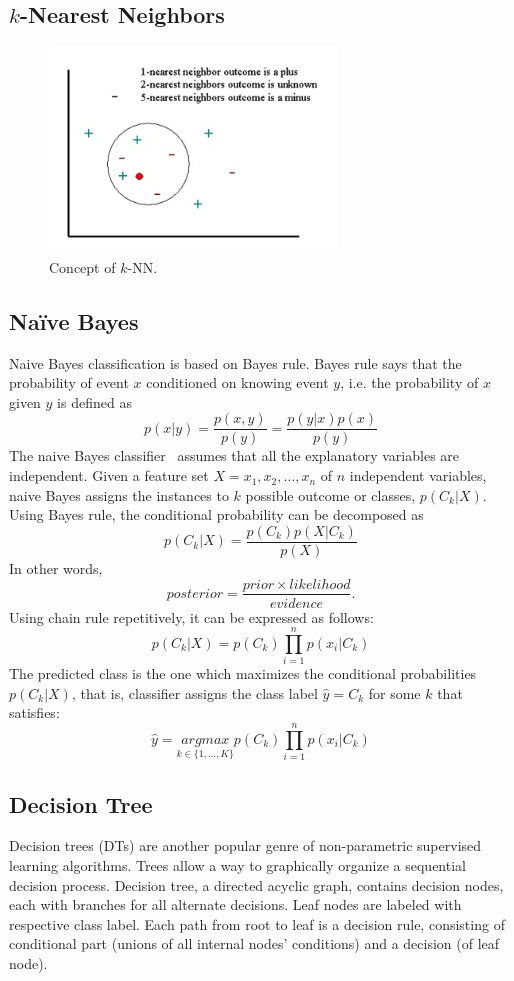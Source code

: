 \documentclass[a4paper, 11pt, oneside]{book}
\begin{document}
\subsection{$k$-Nearest Neighbors}

\begin{figure}[htbp]
    \begin{center}
        \includegraphics[width=3.0in]{figs/knn.jpg}
        \caption{Concept of $k$-NN.}
        \label{fig:bg:knn}
    \end{center}
\end{figure}

\subsection{Na\"ive Bayes}
Naive Bayes classification is based on Bayes rule. Bayes rule says that the probability of event $x$ conditioned on knowing event $y$, i.e. the probability of $x$ given $y$ is defined as
\[
    p(x|y) = \frac{p(x,y)}{p(y)} = \frac{p(y|x) p(x)}{p(y)}
\]
The naive Bayes classifier~\cite{langley92:nb} assumes that all the explanatory variables are independent. Given a feature set $X = x_1, x_2, \dots, x_n$ of $n$ independent variables, naive Bayes assigns the instances to $k$ possible outcome or classes, $p(C_k | X)$. Using Bayes rule, the conditional probability can be decomposed as
\[
    p(C_k |X) = \frac{p(C_k) p(X|C_k)}{p(X)}
\]
In other words,
\[
    posterior = \frac{prior \times likelihood}{evidence}.
\]
Using chain rule repetitively, it can be expressed as follows:
\[
    p(C_k |X) = p(C_k) \prod_{i=1}^n p(x_i | C_k)
\]
The predicted class is the one which maximizes the conditional probabilities $p(C_k|X)$, that is, classifier assigns the class label $\hat{y} = C_k$ for some $k$ that satisfies:
\[
    \hat{y} = \underset{k \in \{1, \dots, K\}}{argmax}  p(C_k) \prod_{i=1}^n p(x_i | C_k)
\]

\subsection{Decision Tree}
Decision trees (DTs) are another popular genre of non-parametric supervised learning algorithms. Trees allow a way to graphically organize a sequential decision process. Decision tree, a directed acyclic graph, contains decision nodes, each with branches for all alternate decisions. Leaf nodes are labeled with respective class label. Each path from root to leaf is a decision rule, consisting of conditional part (unions of all internal nodes' conditions) and a decision (of leaf node).
\end{document}
